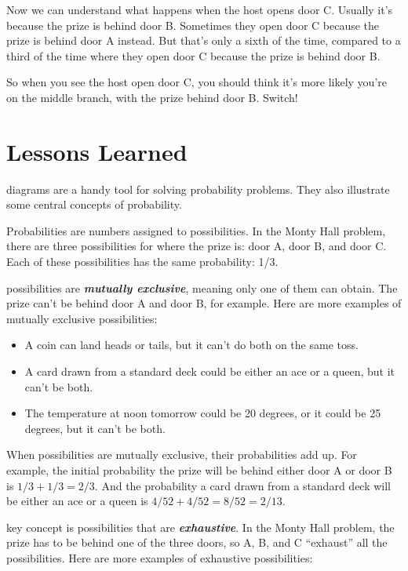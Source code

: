 \documentclass[justified]{tufte-book}
\providecommand{\tightlist}{%
  \setlength{\itemsep}{0pt}\setlength{\parskip}{0pt}}
\theoremstyle{definition}
\theoremstyle{definition}
\theoremstyle{definition}
\theoremstyle{remark}
\begin{document}
Now we can understand what happens when the host opens door C. Usually
it's because the prize is behind door B. Sometimes they open door C
because the prize is behind door A instead. But that's only a sixth of
the time, compared to a third of the time where they open door C because
the prize is behind door B.

So when you see the host open door C, you should think it's more likely
you're on the middle branch, with the prize behind door B. Switch!

\hypertarget{lessons}{%
\section{Lessons Learned}\label{lessons}}

 diagrams are a handy tool for solving probability
problems. They also illustrate some central concepts of probability.

Probabilities are numbers assigned to possibilities. In the Monty Hall
problem, there are three possibilities for where the prize is: door A,
door B, and door C. Each of these possibilities has the same
probability: 1/3.

 possibilities are \textbf{\emph{mutually exclusive}},
meaning only one of them can obtain. The prize can't be behind door A
and door B, for example. Here are more examples of mutually exclusive
possibilities:

\begin{itemize}
\tightlist
\item
  A coin can land heads or tails, but it can't do both on the same toss.
\item
  A card drawn from a standard deck could be either an ace or a queen,
  but it can't be both.
\item
  The temperature at noon tomorrow could be 20 degrees, or it could be
  25 degrees, but it can't be both.
\end{itemize}

When possibilities are mutually exclusive, their probabilities add up.
For example, the initial probability the prize will be behind either
door A or door B is \(1/3 + 1/3 = 2/3\). And the probability a card
drawn from a standard deck will be either an ace or a queen is
\(4/52 + 4/52 = 8/52 = 2/13\).

 key concept is possibilities that are
\textbf{\emph{exhaustive}}. In the Monty Hall problem, the prize has to
be behind one of the three doors, so A, B, and C ``exhaust'' all the
possibilities. Here are more examples of exhaustive possibilities:
\end{document}
